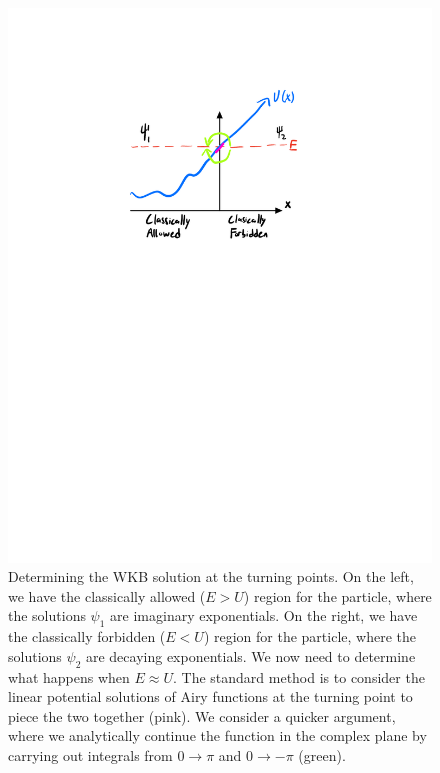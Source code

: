 \begin{figure}[htbp]
    \centering
    \includegraphics[scale=0.8]{Images/fig-connectionformula.pdf}

    \caption{Determining the WKB solution at the turning points. On the left, we have the classically allowed ($E > U$) region for the particle, where the solutions $\psi_1$ are imaginary exponentials. On the right, we have the classically forbidden ($E < U$) region for the particle, where the solutions $\psi_2$ are decaying exponentials. We now need to determine what happens when $E \approx U$. The standard method is to consider the linear potential solutions of Airy functions at the turning point to piece the two together (pink). We consider a quicker argument, where we analytically continue the function in the complex plane by carrying out integrals from $0 \to \pi$ and $0 \to -\pi$ (green).}
    \label{fig-connectionformula}
\end{figure}


